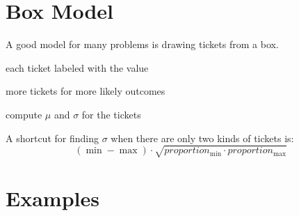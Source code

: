 \documentclass[letterpaper,landscape]{exam}
\begin{document}
  \section{Box Model}
  A good model for many problems is drawing tickets from a box.
  \begin{itemize*}
    \item each ticket labeled with the value
    \item more tickets for more likely outcomes
    \item compute $\mu$ and $\sigma$ for the tickets
  \end{itemize*}

  A shortcut for finding $\sigma$ when there are only two kinds of tickets is:
  \[
    (\min - \max) \cdot \sqrt{proportion_{\min} \cdot proportion_{\max}}
  \]

  \section{Examples}
\end{document}
